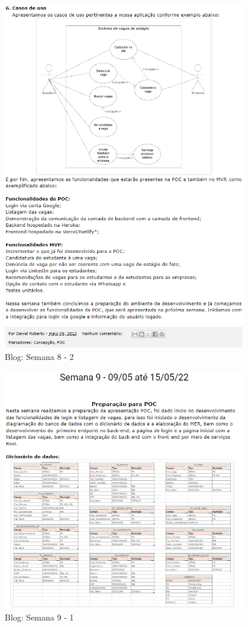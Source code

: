 \begin{apendicesenv}
\begin{figure}[H]
\end{figure}
\begin{figure}[H]
	\centering
	\caption{Blog: Semana 8 - 2}
	\includegraphics[width=0.95\textwidth]{../imagens/blog-posts/semana08-2.png}
\end{figure}
\begin{figure}[H]
	\centering
	\caption{Blog: Semana 9 - 1}
	\includegraphics[width=0.95\textwidth]{../imagens/blog-posts/semana09-1.png}

\end{figure}
\end{apendicesenv}
